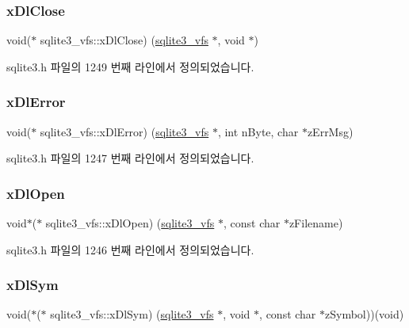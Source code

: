 \subsubsection{\texorpdfstring{x\+Dl\+Close}{xDlClose}}
{\footnotesize\ttfamily void($\ast$ sqlite3\+\_\+vfs\+::x\+Dl\+Close) (\hyperlink{structsqlite3__vfs}{sqlite3\+\_\+vfs} $\ast$, void $\ast$)}



sqlite3.\+h 파일의 1249 번째 라인에서 정의되었습니다.

\mbox{\label{structsqlite3__vfs_ace296f3efa5d1a490c892069891f37c0}} 
\subsubsection{\texorpdfstring{x\+Dl\+Error}{xDlError}}
{\footnotesize\ttfamily void($\ast$ sqlite3\+\_\+vfs\+::x\+Dl\+Error) (\hyperlink{structsqlite3__vfs}{sqlite3\+\_\+vfs} $\ast$, int n\+Byte, char $\ast$z\+Err\+Msg)}



sqlite3.\+h 파일의 1247 번째 라인에서 정의되었습니다.

\mbox{\label{structsqlite3__vfs_a4de0324cd74c8ec98e4605d432f16e0a}} 
\subsubsection{\texorpdfstring{x\+Dl\+Open}{xDlOpen}}
{\footnotesize\ttfamily void$\ast$($\ast$ sqlite3\+\_\+vfs\+::x\+Dl\+Open) (\hyperlink{structsqlite3__vfs}{sqlite3\+\_\+vfs} $\ast$, const char $\ast$z\+Filename)}



sqlite3.\+h 파일의 1246 번째 라인에서 정의되었습니다.

\mbox{\label{structsqlite3__vfs_a847ba7d9a80164138031aacef1d01507}} 
\subsubsection{\texorpdfstring{x\+Dl\+Sym}{xDlSym}}
{\footnotesize\ttfamily void($\ast$($\ast$ sqlite3\+\_\+vfs\+::x\+Dl\+Sym) (\hyperlink{structsqlite3__vfs}{sqlite3\+\_\+vfs} $\ast$, void $\ast$, const char $\ast$z\+Symbol))(void)}



